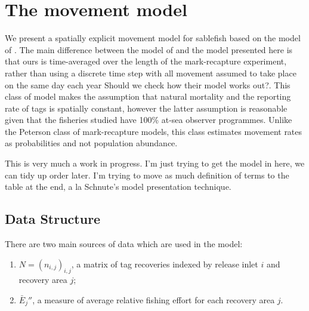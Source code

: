 \documentclass[12pt]{article}
\newcommand{\sj}[1]{{\color{red}\mbox{}\marginpar{\raggedleft\hspace{0pt}*} #1}}
\begin{document}
\section{The movement model}

We present a spatially explicit movement model for sablefish based on the model of \citet{mcgarvey2002estimating}. The main difference between the model of \citet{mcgarvey2002estimating} and the model presented here is that ours is time-averaged over the length of the mark-recapture experiment, rather than using a discrete time step with all movement assumed to take place on the same day each year \sj{Should we check how their model works out?}. This class of model makes the assumption that natural mortality and the reporting rate of tags is spatially constant, however the latter assumption is reasonable given that the fisheries studied have 100\% at-sea observer programmes. Unlike the Peterson class of mark-recapture models, this class estimates movement rates as probabilities and not population abundance.

\sj{This is very much a work in progress. I'm just trying to get the model in here, we can tidy up order later. I'm trying to move as much definition of terms to the table at the end, a la Schnute's model presentation technique.}

\subsection{Data Structure}

There are two main sources of data which are used in the model:
\begin{enumerate}
  \item $N = (n_{i,j})_{i,j}$, a matrix of tag recoveries indexed by release inlet $i$ and recovery area $j$;
  \item $\bar{E}_j''$, a measure of average relative fishing effort for each recovery area $j$.
\end{enumerate}
\end{document}
